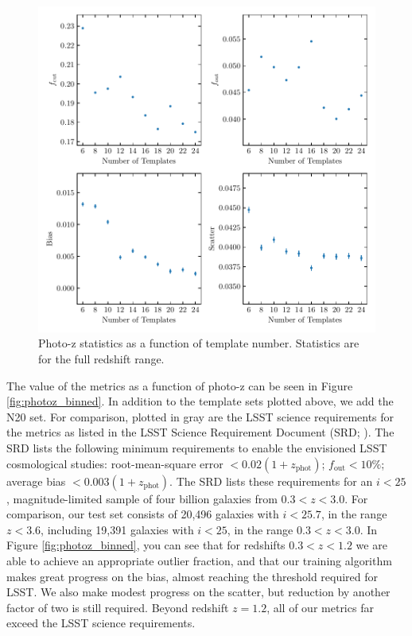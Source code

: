 \begin{figure}
    \centering
    \includegraphics{figures/Ntemplates.pdf}
    \caption{Photo-z statistics as a function of template number. Statistics are for the full redshift range.}
    \label{fig:Ntemplates}
\end{figure}

The value of the metrics as a function of photo-z can be seen in Figure \ref{fig:photoz_binned}.
In addition to the template sets plotted above, we add the N20 set.
For comparison, plotted in gray are the LSST science requirements for the metrics as listed in the LSST Science Requirement Document (SRD; \citealt{Ivezic2018}).
The SRD lists the following minimum requirements to enable the envisioned LSST cosmological studies: root-mean-square error $< 0.02(1+z_\text{phot})$; $f_\text{out} < 10\%$; average bias $<0.003(1+z_\text{phot})$.
The SRD lists these requirements for an $i<25$, magnitude-limited sample of four billion galaxies from $0.3 < z < 3.0$.
For comparison, our test set consists of 20,496 galaxies with $i < 25.7$, in the range $z < 3.6$, including 19,391 galaxies with $i < 25$, in the range $0.3 < z < 3.0$.
In Figure \ref{fig:photoz_binned}, you can see that for redshifts $0.3 < z < 1.2$ we are able to achieve an appropriate outlier fraction, and that our training algorithm makes great progress on the bias, almost reaching the threshold required for LSST.
We also make modest progress on the scatter, but reduction by another factor of two is still required.
Beyond redshift $z=1.2$, all of our metrics far exceed the LSST science requirements.

